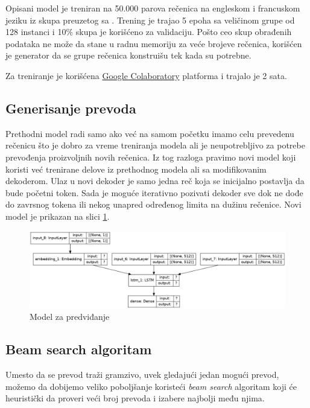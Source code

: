 \documentclass[a4paper]{article}
\begin{document}
Opisani model je treniran na 50.000 parova rečenica na engleskom i francuskom jeziku iz skupa preuzetog sa \cite{manythings}. Trening je trajao 5 epoha sa veličinom grupe od 128 instanci i 10\% skupa je korišćeno za validaciju.
Pošto ceo skup obrađenih podataka ne može da stane u radnu memoriju za veće brojeve rečenica, korišćen je generator da se grupe rečenica konstruišu tek kada su potrebne.

Za treniranje je korišćena \href{https://colab.research.google.com/}{Google Colaboratory} platforma i trajalo je 2 sata.

\subsection{Generisanje prevoda}

Prethodni model radi samo ako već na samom početku imamo celu prevedenu rečenicu što je dobro za vreme treniranja modela ali je neupotrebljivo za potrebe prevođenja proizvoljnih novih rečenica. Iz tog razloga pravimo novi model koji koristi već trenirane delove iz prethodnog modela ali sa modifikovanim dekoderom.
Ulaz u novi dekoder je samo jedna reč koja se inicijalno postavlja da bude početni token. Sada je moguće iterativno pozivati dekoder sve dok ne dođe do zavrsnog tokena ili nekog unapred određenog limita na dužinu rečenice.
Novi model je prikazan na slici \ref{fig:inference_model}.

\begin{figure}[h!]
  \centering
    \includegraphics[width=\textwidth]{inference_model}
  \caption{Model za predviđanje}
  \label{fig:inference_model}
\end{figure}

\subsection{Beam search algoritam}

Umesto da se prevod traži gramzivo, uvek gledajući jedan mogući prevod, možemo da dobijemo veliko poboljšanje koristeći \textit{beam search} algoritam koji će heuristički da proveri veći broj prevoda i izabere najbolji među njima.
\end{document}
